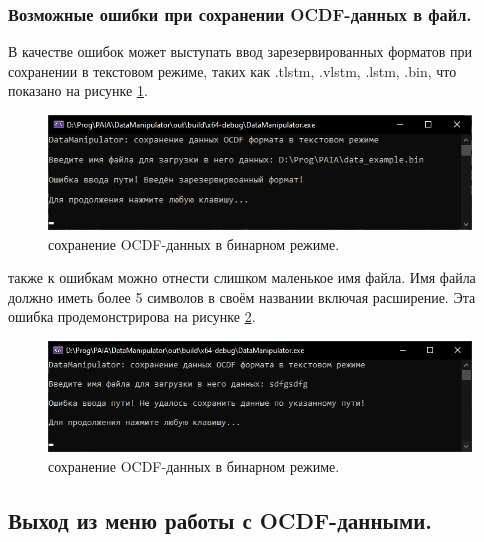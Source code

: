 \subsubsection{ \standartTitleFont
  Возможные ошибки при сохранении OCDF-данных в файл.
} \label{subsubsec:OCDFSageErr}

{\standartFont

  \par В качестве ошибок может выступать ввод зарезервированных форматов при сохранении в текстовом режиме, таких как .tlstm, .vlstm, .lstm, .bin, что показано на рисунке \ref{fig:OCDFsafeERes}.

  \begin{figure}[H]
    \centering
    \includegraphics[width=\textwidth]{images/forDataManipulator/OCDFsafeCSVErrReser.png}
    \caption{сохранение OCDF-данных в бинарном режиме.} 
    \label{fig:OCDFsafeERes}
  \end{figure}

  \par также к ошибкам можно отнести слишком маленькое имя файла. Имя файла должно иметь более 5 символов в своём названии включая расширение. Эта ошибка продемонстрирова на рисунке \ref{fig:OCDFsafeEInv}.

  \begin{figure}[H]
    \centering
    \includegraphics[width=\textwidth]{images/forDataManipulator/OCDFsafeCSVErrInvalid.png}
    \caption{сохранение OCDF-данных в бинарном режиме.} 
    \label{fig:OCDFsafeEInv}
  \end{figure}
}

\subsection{ \standartTitleFont
  Выход из меню работы с OCDF-данными.
} \label{subsec:OCDFOut}

